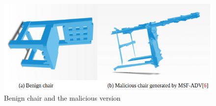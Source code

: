 


\begin{figure}
	\centering
	\includegraphics[width=1\linewidth]{figure/benign&ma.png}
	\caption{Benign chair and the malicious version}
	\label{fig:noisy}
\end{figure}
